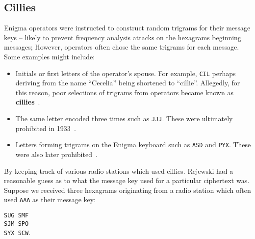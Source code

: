 \subsection{Cillies}\label{section_cillies}
Enigma operators were instructed to construct random trigrams for
their message keys -- likely to prevent frequency analysis attacks on
the hexagrams beginning messages; However, operators often chose the
same trigrams for each message. Some examples might include:
\begin{itemize}
  \item Initials or first letters of the operator's spouse. For
    example, \texttt{CIL} perhaps deriving from the name ``Cecelia''
    being shortened to ``cillie''. Allegedly, for this reason, poor
    selections of trigrams from operators became known as {\bf{cillies}}~\cite[p.~143]{BudianskyBattleOfWits2000}.
  \item The same letter encoded three times such as \texttt{JJJ}.
    These were ultimately prohibited in 1933~\cite[p.~241]{KozaczukEnigma1984}.
  \item Letters forming trigrams on the Enigma keyboard such as
    \texttt{ASD} and \texttt{PYX}. These were also later prohibited~\cite[p.~241]{KozaczukEnigma1984}.

\end{itemize}
By keeping track of various radio stations which used cillies.
Rejewski had a reasonable guess as to what the message key used for a
particular ciphertext was. Suppose we received three hexagrams
originating from a radio station which often used \texttt{AAA} as
their message key:
\begin{center}
  \texttt{SUG SMF}\\
  \texttt{SJM SPO}\\
  \texttt{SYX SCW}.
\end{center}


